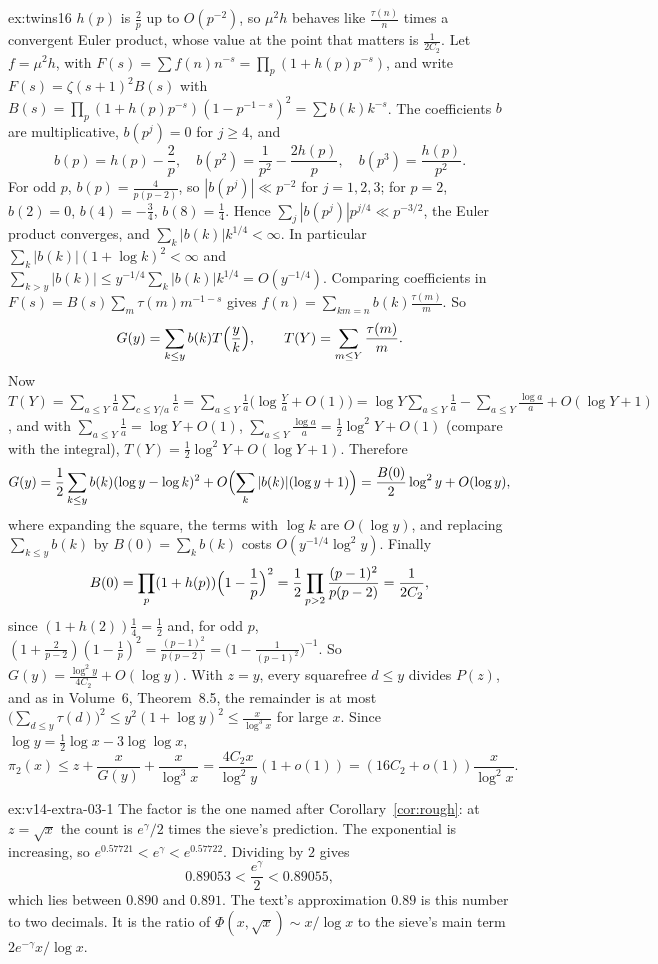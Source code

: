 \begin{solution}{ex:twins16}
\idea $h(p)$ is $\frac2p$ up to $O(p^{-2})$, so $\mu^2h$ behaves like $\frac{\tau(n)}n$ times a convergent Euler product, whose value at the point that matters is $\frac1{2C_2}$.
\writeup Let $f=\mu^2h$, with $F(s)=\sum f(n)n^{-s}=\prod_p(1+h(p)p^{-s})$, and write $F(s)=\zeta(s+1)^2B(s)$ with $B(s)=\prod_p(1+h(p)p^{-s})(1-p^{-1-s})^2=\sum b(k)k^{-s}$. The coefficients $b$ are multiplicative, $b(p^j)=0$ for $j\ge4$, and
\[
b(p)=h(p)-\frac2p,\quad b(p^2)=\frac1{p^2}-\frac{2h(p)}p,\quad b(p^3)=\frac{h(p)}{p^2}.
\]
For odd $p$, $b(p)=\frac4{p(p-2)}$, so $|b(p^j)|\ll p^{-2}$ for $j=1,2,3$; for $p=2$, $b(2)=0$, $b(4)=-\frac34$, $b(8)=\frac14$. Hence $\sum_j|b(p^j)|p^{j/4}\ll p^{-3/2}$, the Euler product converges, and $\sum_k|b(k)|k^{1/4}<\infty$. In particular $\sum_k|b(k)|(1+\log k)^2<\infty$ and $\sum_{k>y}|b(k)|\le y^{-1/4}\sum_k|b(k)|k^{1/4}=O(y^{-1/4})$.
Comparing coefficients in $F(s)=B(s)\sum_m\tau(m)m^{-1-s}$ gives $f(n)=\sum_{km=n}b(k)\frac{\tau(m)}m$. So
\[
G(y)=\sum_{k\le y}b(k)T\Bigl(\frac yk\Bigr),\qquad T(Y)=\sum_{m\le Y}\frac{\tau(m)}m.
\]
Now $T(Y)=\sum_{a\le Y}\frac1a\sum_{c\le Y/a}\frac1c=\sum_{a\le Y}\frac1a\bigl(\log\frac Ya+O(1)\bigr)=\log Y\sum_{a\le Y}\frac1a-\sum_{a\le Y}\frac{\log a}a+O(\log Y+1)$, and with $\sum_{a\le Y}\frac1a=\log Y+O(1)$, $\sum_{a\le Y}\frac{\log a}a=\frac12\log^2Y+O(1)$ (compare with the integral), $T(Y)=\frac12\log^2Y+O(\log Y+1)$. Therefore
\[
G(y)=\frac12\sum_{k\le y}b(k)(\log y-\log k)^2+O\Bigl(\sum_k|b(k)|(\log y+1)\Bigr)=\frac{B(0)}2\log^2y+O(\log y),
\]
where expanding the square, the terms with $\log k$ are $O(\log y)$, and replacing $\sum_{k\le y}b(k)$ by $B(0)=\sum_kb(k)$ costs $O(y^{-1/4}\log^2y)$. Finally
\[
B(0)=\prod_p(1+h(p))\Bigl(1-\frac1p\Bigr)^2=\frac12\prod_{p>2}\frac{(p-1)^2}{p(p-2)}=\frac1{2C_2},
\]
since $(1+h(2))\frac14=\frac12$ and, for odd $p$, $(1+\frac2{p-2})(1-\frac1p)^2=\frac{(p-1)^2}{p(p-2)}=\bigl(1-\frac1{(p-1)^2}\bigr)^{-1}$. So $G(y)=\frac{\log^2y}{4C_2}+O(\log y)$.
With $z=y$, every squarefree $d\le y$ divides $P(z)$, and as in Volume~6, Theorem~8.5, the remainder is at most $\bigl(\sum_{d\le y}\tau(d)\bigr)^2\le y^2(1+\log y)^2\le\frac x{\log^3x}$ for large $x$. Since $\log y=\frac12\log x-3\log\log x$,
\[
\pi_2(x)\le z+\frac x{G(y)}+\frac x{\log^3x}=\frac{4C_2x}{\log^2y}(1+o(1))=(16C_2+o(1))\frac x{\log^2x}.
\]
\end{solution}

\begin{solution}{ex:v14-extra-03-1}
\idea The factor is the one named after Corollary~\ref{cor:rough}: at $z=\sqrt x$ the count is $e^\gamma/2$ times the sieve's prediction.
\writeup The exponential is increasing, so $e^{0.57721}<e^\gamma<e^{0.57722}$. Dividing by $2$ gives
\[
0.89053<\frac{e^\gamma}2<0.89055,
\]
which lies between $0.890$ and $0.891$. The text's approximation $0.89$ is this number to two decimals. It is the ratio of $\Phi(x,\sqrt x)\sim x/\log x$ to the sieve's main term $2e^{-\gamma}x/\log x$.
\end{solution}

